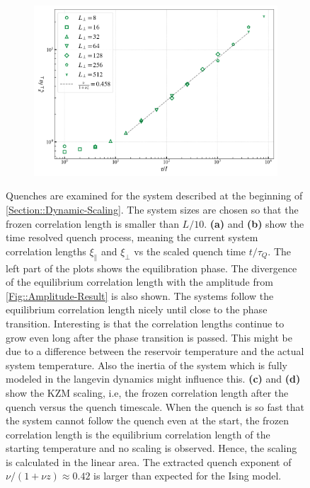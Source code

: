 \begin{figure}
\begin{subfigure}{0.475\textwidth}
		\end{subfigure}
		\begin{subfigure}{0.475\textwidth}
			\centering
			\includegraphics[width=0.95\linewidth]{graphics/tau-xi-perp3.png}
		\end{subfigure}
		\caption{Quenches are examined for the system described at the beginning of \autoref{Section::Dynamic-Scaling}. The system sizes are chosen so that the frozen correlation length is smaller than $L/10$. \textbf{(a)} and \textbf{(b)} show the time resolved quench process, meaning the current system correlation lengths $\xi_\parallel$ and $\xi_\perp$ vs the scaled quench time $t /	\tau_Q$. The left part of the plots shows the equilibration phase. The divergence of the equilibrium correlation length with the amplitude from \autoref{Fig::Amplitude-Result} is also shown. The systems follow the equilibrium correlation length nicely until close to the phase transition. Interesting is that the correlation lengths continue to grow even long after the phase transition is passed. This might be due to a difference between the reservoir temperature and the actual system temperature. Also the inertia of the system which is fully modeled in the langevin dynamics might influence this. \textbf{(c)} and \textbf{(d)} show the KZM scaling, i.e, the frozen correlation length after the quench versus the quench timescale. When the quench is so fast that the system cannot follow the quench even at the start, the frozen correlation length is the equilibrium correlation length of the starting temperature and no scaling is observed. Hence, the scaling is calculated in the linear area. The extracted quench exponent of $\nu / (1 + \nu z) \approx 0.42$ is larger than expected for the Ising model. }
		\label{Fig::Quench-Result}
	\end{figure}
